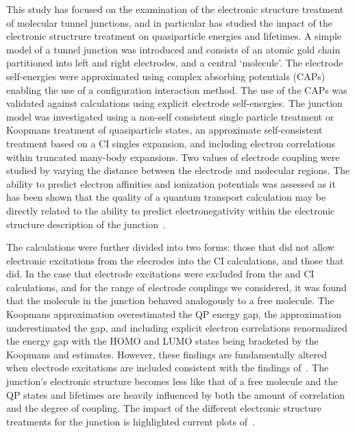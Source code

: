 This study has focused on the examination of the electronic structure
treatment of molecular tunnel junctions, and in particular has studied
the impact of the electronic structrure treatment on quasiparticle
energies and lifetimes. A simple model of a tunnel junction was introduced
and consists of an atomic gold chain partitioned into left and right
electrodes, and a central `molecule'. The electrode self-energies were
approximated using complex absorbing potentials (\acp{CAP}) enabling the
use of a configuration interaction method. The use of the \acp{CAP} was
validated against calculations using explicit electrode self-energies.
The junction model was investigated using a non-self consistent single
particle treatment or Koopmans treatment of quasiparticle states, an
approximate self-consistent treatment based on a CI singles expansion,
and including electron correlations within truncated many-body expansions.
Two values of electrode coupling were studied by varying the distance
between the electrode and molecular regions. The ability to predict
electron affinities and ionization potentials was assessed as it has been
shown that the quality of a quantum transport calculation may be directly
related to the ability to predict electronegativity within the electronic
structure description of the junction~\cite{golden}. 

The calculations were further divided into two forms: those that did not
allow electronic excitations from the elecrodes into the CI calculations,
and those that did. In the case that electrode excitations were excluded
from the \dscf and CI calculations, and for the range of electrode
couplings we considered, it was found that the molecule in the junction
behaved analogously to a free molecule. The Koopmans approximation
overestimated the QP energy gap, the \dscf approximation underestimated
the gap, and including explicit electron correlations renormalized the
energy gap with the HOMO and LUMO states being bracketed by the Koopmans
and \dscf estimates. However, these findings are fundamentally
altered when electrode excitations are included consistent with the findings
of~\cite{galperin_nitzan2006leadexcitations}.
The junction's electronic structure becomes less like that of a free
molecule and the QP states and lifetimes are heavily influenced by both
the amount of correlation and the degree of coupling. The impact of the
different electronic structure treatments for the junction is highlighted
current plots of~.
